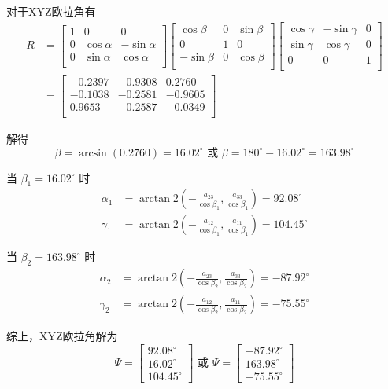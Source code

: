\documentclass[UTF8, 13pt]{ctexart}
\begin{document}
对于XYZ欧拉角有
\[
\begin{aligned}
    R &= \begin{bmatrix}
        1 & 0 & 0 \\
        0 & \cos\alpha & -\sin\alpha \\
        0 & \sin\alpha & \cos\alpha \\
        \end{bmatrix}
        \begin{bmatrix}
        \cos\beta & 0 & \sin\beta \\
        0 & 1 & 0 \\
        -\sin\beta & 0 & \cos\beta \\
        \end{bmatrix}
        \begin{bmatrix}
        \cos\gamma & -\sin\gamma & 0 \\
        \sin\gamma & \cos\gamma & 0 \\
        0 & 0 & 1 \\
        \end{bmatrix} \\
        &= \begin{bmatrix}
        -0.2397 & -0.9308 & 0.2760 \\
        -0.1038 & -0.2581 & -0.9605 \\
        0.9653 & -0.2587 & -0.0349 \\
        \end{bmatrix}
\end{aligned}
\]

解得
\[
\beta = \arcsin(0.2760) = 16.02^\circ \text{ 或 } \beta = 180^\circ - 16.02^\circ = 163.98^\circ
\]

当 $\beta_1 = 16.02^\circ$ 时
\[
\begin{aligned}
    \alpha_1 &= \arctan2\left(-\frac{a_{23}}{\cos\beta_1}, \frac{a_{33}}{\cos\beta_1}\right) = 92.08^\circ \\
    \gamma_1 &= \arctan2\left(-\frac{a_{12}}{\cos\beta_1}, \frac{a_{11}}{\cos\beta_1}\right) = 104.45^\circ
\end{aligned}
\]

当 $\beta_2 = 163.98^\circ$ 时
\[
\begin{aligned}
    \alpha_2 &= \arctan2\left(-\frac{a_{23}}{\cos\beta_2}, \frac{a_{33}}{\cos\beta_2}\right) = -87.92^\circ \\
    \gamma_2 &= \arctan2\left(-\frac{a_{12}}{\cos\beta_2}, \frac{a_{11}}{\cos\beta_2}\right) = -75.55^\circ
\end{aligned}
\]

综上，XYZ欧拉角解为
\[
\Psi = \begin{bmatrix}
        92.08^\circ \\ 16.02^\circ \\ 104.45^\circ
        \end{bmatrix} 
        \text{ 或 } 
\Psi = \begin{bmatrix}
        -87.92^\circ \\ 163.98^\circ \\ -75.55^\circ
        \end{bmatrix}
\]
\end{document}
